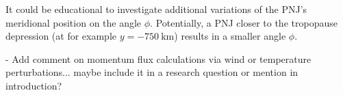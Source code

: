 It could be educational to investigate additional variations of the PNJ's meridional position on the angle $\phi$. Potentially, a PNJ closer to the tropopause depression (at for example $y=\SI{-750}{\kilo\meter}$) results in a smaller angle $\phi$.

- Add comment on momentum flux calculations via wind or temperature perturbations... maybe include it in a research question or mention in introduction?


